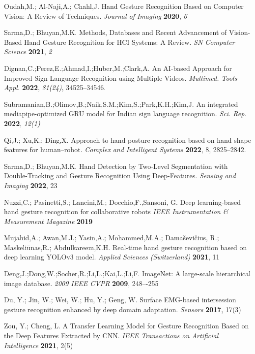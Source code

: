 \begin{thebibliography}{999}
Oudah,M.; Al-Naji,A.; Chahl,J. Hand Gesture Recognition Based on Computer Vision: A Review of Techniques. {\em Journal of Imaging} {\bf 2020}, {\em 6}

Sarma,D.; Bhuyan,M.K. Methods, Databases and Recent Advancement of Vision-Based Hand Gesture Recognition for HCI Systems: A Review. {\em SN Computer Science} {\bf 2021}, {\em 2}

Dignan,C.;Perez,E.;Ahmad,I.;Huber,M.;Clark,A. An AI-based Approach for Improved Sign Language Recognition using Multiple Videos. {\em Multimed. Tools Appl.} {\bf 2022}, {\em 81(24)}, 34525--34546.

Subramanian,B.;Olimov,B.;Naik,S.M.;Kim,S.;Park,K.H.;Kim,J. An integrated mediapipe-optimized GRU model for Indian sign language recognition. {\em Sci. Rep.} {\bf 2022}, {\em 12(1)}

Qi,J.; Xu,K.; Ding,X. Approach to hand posture recognition based on hand shape features for human–robot. {\em Complex and Intelligent Systems} {\bf 2022}, {8}, 2825--2842.

Sarma,D.; Bhuyan,M.K. Hand Detection by Two-Level Segmentation with Double-Tracking and Gesture Recognition Using Deep-Features. {\em Sensing and Imaging} {\bf 2022}, {23}

Nuzzi,C.; Pasinetti,S.; Lancini,M.; Docchio,F.,Sansoni, G. Deep learning-based hand gesture recognition for collaborative robots {\em IEEE Instrumentation \& Measurement Magazine} {\bf 2019}

Mujahid,A.; Awan,M.J.; Yasin,A.; Mohammed,M.A.; Damaševičius, R.; Maskeliūnas,R.; Abdulkareem,K.H. Real-time hand gesture recognition based on deep learning YOLOv3 model. {\em Applied Sciences (Switzerland)} {\bf 2021}, {11}

Deng,J.;Dong,W.;Socher,R.;Li,L.;Kai,L.;Li,F. ImageNet: A large-scale hierarchical image database. {\em 2009 IEEE CVPR} {\bf 2009}, 248–-255

Du, Y.; Jin, W.; Wei, W.; Hu, Y.; Geng, W.  Surface EMG-based intersession gesture recognition enhanced by deep domain adaptation. {\em Sensors} {\bf 2017}, {17(3)}

Zou, Y.; Cheng, L.  A Transfer Learning Model for Gesture Recognition Based on the Deep Features Extracted by CNN. {\em IEEE Transactions on Artificial Intelligence} {\bf 2021}, {2(5)}


\end{thebibliography}
